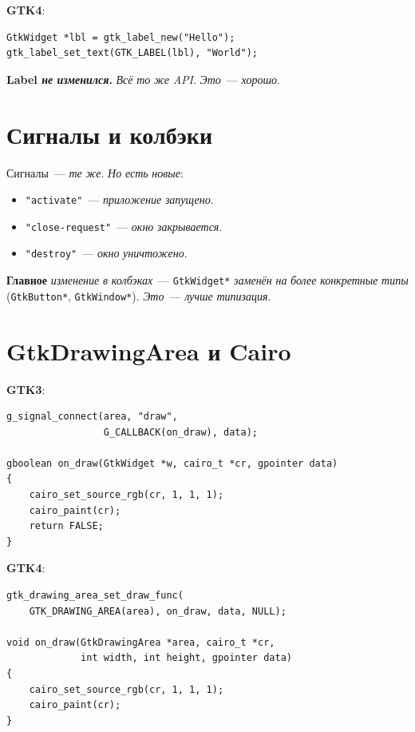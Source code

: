 \textbf{GTK4}:
\begin{verbatim}
GtkWidget *lbl = gtk_label_new("Hello");
gtk_label_set_text(GTK_LABEL(lbl), "World");
\end{verbatim}

\begin{notebox}
\textbf{Label \emph{не} \emph{изменился}.} \emph{Всё} \emph{то}
\emph{же} \emph{API}. \emph{Это}~--- \emph{хорошо}.
\end{notebox}

\section{Сигналы и колбэки}
\label{sec:gtk4-signals}

Сигналы~--- \emph{те} \emph{же}. \emph{Но} \emph{есть}
\emph{новые}:
\begin{itemize}
    \item \texttt{"activate"}~--- \emph{приложение}
          \emph{запущено}.
    \item \texttt{"close-request"}~--- \emph{окно}
          \emph{закрывается}.
    \item \texttt{"destroy"}~--- \emph{окно}
          \emph{уничтожено}.
\end{itemize}

\begin{keybox}
\textbf{Главное} \emph{изменение} \emph{в} \emph{колбэках}~---
\texttt{GtkWidget*} \emph{заменён} \emph{на} \emph{более}
\emph{конкретные} \emph{типы} (\texttt{GtkButton*},
\texttt{GtkWindow*}). \emph{Это}~--- \emph{лучше}
\emph{типизация}.
\end{keybox}

\section{GtkDrawingArea и Cairo}
\label{sec:gtk4-drawing}

\textbf{GTK3}:
\begin{verbatim}
g_signal_connect(area, "draw",
                 G_CALLBACK(on_draw), data);

gboolean on_draw(GtkWidget *w, cairo_t *cr, gpointer data)
{
    cairo_set_source_rgb(cr, 1, 1, 1);
    cairo_paint(cr);
    return FALSE;
}
\end{verbatim}

\textbf{GTK4}:
\begin{verbatim}
gtk_drawing_area_set_draw_func(
    GTK_DRAWING_AREA(area), on_draw, data, NULL);

void on_draw(GtkDrawingArea *area, cairo_t *cr,
             int width, int height, gpointer data)
{
    cairo_set_source_rgb(cr, 1, 1, 1);
    cairo_paint(cr);
}
\end{verbatim}

